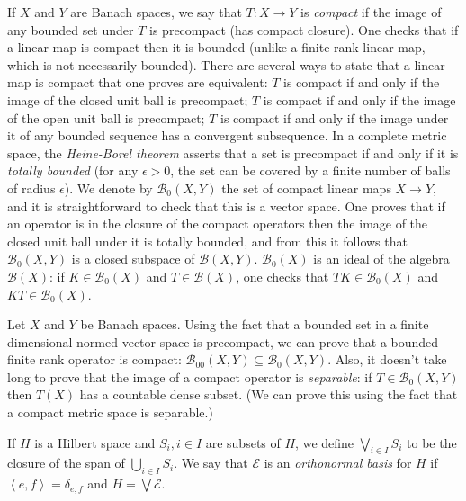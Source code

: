 \documentclass{article}
\newcommand{\inner}[2]{\left\langle #1, #2 \right\rangle}
\theoremstyle{definition}
\begin{document}
If $X$ and $Y$ are Banach spaces, we say that $T:X \to Y$ is {\em compact} if the image of any bounded set under $T$ is precompact (has compact
closure). One
checks that if a linear map is compact then it is bounded (unlike a finite rank linear map, which is not necessarily bounded). There are several ways to state that a linear map is compact that one proves are equivalent:
$T$ is compact if and only if the image of the closed unit ball is precompact;
$T$ is compact if and only if the image of the open unit ball is precompact;
$T$ is compact
if and only if  the image under it of any bounded sequence has a convergent subsequence.
In a complete metric space, the {\em Heine-Borel theorem} asserts that a set is precompact   if and only if it is {\em totally
bounded} (for any $\epsilon>0$, the set can be covered by a finite number of balls of radius $\epsilon$).
We denote by $\mathscr{B}_0(X,Y)$ the set of compact
linear maps $X \to Y$, and it is straightforward to check that this is a vector space. One proves that if an operator is in the closure of the compact operators then the image of the closed unit
ball under it is totally bounded, and from this it follows that $\mathscr{B}_0(X,Y)$ is a closed
subspace of $\mathscr{B}(X,Y)$.
$\mathscr{B}_0(X)$ is an ideal of the algebra $\mathscr{B}(X)$: if $K \in \mathscr{B}_0(X)$ and $T \in \mathscr{B}(X)$, one checks that $TK \in \mathscr{B}_0(X)$ and 
$KT \in \mathscr{B}_0(X)$. 

Let $X$ and $Y$ be Banach spaces.
Using the fact that a bounded set in a finite dimensional normed vector space is precompact,
we can prove that a bounded finite rank operator is compact: $\mathscr{B}_{00}(X,Y) \subseteq \mathscr{B}_0(X,Y)$.
Also, it doesn't take long to prove that the image of a compact operator is {\em separable}: if $T \in \mathscr{B}_0(X,Y)$ then $T(X)$ has a countable dense subset. (We can
prove this
using the fact that a compact metric space is separable.) 


If $H$ is a Hilbert space and $S_i, i \in I$ are  subsets of $H$, we define $\bigvee_{i \in I} S_i$ to be the closure of the span of
$\bigcup_{i \in I} S_i$. We say that $\mathscr{E}$ is an {\em orthonormal basis} for $H$ if
$\inner{e}{f}=\delta_{e,f}$ and  $H=\bigvee \mathscr{E}$.
\end{document}
